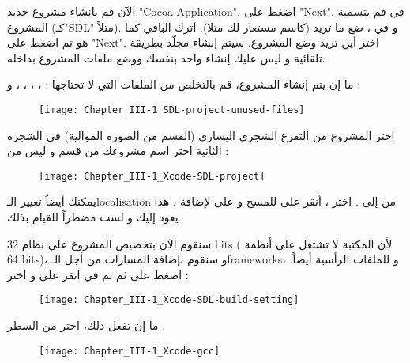 الآن قم بانشاء مشروع جديد
"\textenglish{Cocoa Application}"،
اضغط على
"\textenglish{Next}".
في 
قم بتسمية المشروع (كـ"\textenglish{SDL}"
مثلاً). و في 
،
ضع ما تريد (كاسم مستعار لك مثلا). أترك الباقي كما هو ثم اضغط على 
"\textenglish{Next}".
اختر أين تريد وضع المشروع. سيتم إنشاء مجلّد بطريقة تلقائية و ليس عليك إنشاء واحد بنفسك ووضع ملفات المشروع بداخله.

ما إن يتم إنشاء المشروع، قم بالتخلص من الملفات التي لا تحتاجها :
، ، ، ،  و  :

\begin{figure}[H]
	\centering
	\texttt{[image: Chapter\_III-1\_SDL-project-unused-files]}
\end{figure}

اختر المشروع من التفرع الشجري اليساري (القسم
من الصورة الموالية) في الشجرة الثانية اختر اسم مشروعك من قسم 
و ليس من
 :

\begin{figure}[H]
	\centering
	\texttt{[image: Chapter\_III-1\_Xcode-SDL-project]}
\end{figure}

يمكنك أيضاً تغيير الـ\textenglish{localisation}
من 
إلى 
.
اختر 
،
أنقر على
\InlineCode{-}
للمسح و على 
\InlineCode{+}
لإضافة 
،
هذا يعود إليك و لست مضطراً للقيام بذلك.

سنقوم الآن بتخصيص المشروع على نظام
\textenglish{32 bits}
( لأن المكتبة لا تشتغل على أنظمة
\textenglish{64 bits})،
و سنقوم بإضافة المسارات من أجل الـ\textenglish{frameworks}،
و للملفات الرأسية أيضاً. اضغط على
ثم 
ثم في 
انقر على
 و اختر
 :

\begin{figure}[H]
	\centering
	\texttt{[image: Chapter\_III-1\_Xcode-SDL-build-setting]}
\end{figure}


ما إن تفعل ذلك، اختر
من السطر
.

\begin{figure}[H]
	\centering
	\texttt{[image: Chapter\_III-1\_Xcode-gcc]}
\end{figure}

